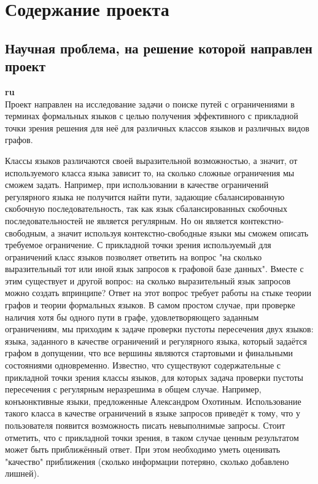 \documentclass[12pt]{article}  %
\theoremstyle{remark}
\begin{document}
\section{Содержание проекта}

\subsection{Научная проблема, на решение которой направлен проект}

\textbf{ru}\\
%
Проект направлен на исследование задачи о поиске путей с ограничениями в терминах формальных языков с целью получения эффективного с прикладной точки зрения решения для неё для различных классов языков и различных видов графов.

Классы языков различаются своей выразительной возможностью, а значит, от используемого класса языка зависит то, на сколько сложные ограничения мы сможем задать.
Например, при использовании в качестве ограничений регулярного языка не получится найти пути, задающие сбалансированную скобочную последовательность, так как язык сбалансированных скобочных последовательностей не является регулярным.
Но он является контекстно-свободным, а значит используя контекстно-свободные языки мы сможем описать требуемое ограничение.
С прикладной точки зрения используемый для ограничений класс языков позволяет ответить на вопрос "на сколько выразительный тот или иной язык запросов к графовой базе данных".
Вместе с этим существует и другой вопрос: на сколько выразительный язык запросов можно создать впринципе?
Ответ на этот вопрос требует работы на стыке теории графов и теории формальных языков.
В самом простом случае, при проверке наличия хотя бы одного пути в графе, удовлетворяющего заданным ограничениям, мы приходим к задаче проверки пустоты пересечения двух языков: языка, заданного в качестве ограничений и регулярного языка, который задаётся графом в допущении, что все вершины являются стартовыми и финальными состояниями одновременно.
Известно, что существуют содержательные с прикладной точки зрения классы языков, для которых задача проверки пустоты пересечения с регулярным неразрешима в общем случае.
Например, конъюнктивные языки, предложенные Александром Охотиным.
Использование такого класса в качестве ограничений в языке запросов приведёт к тому, что у пользователя появится возможность писать невыполнимые запросы.
Стоит отметить, что с прикладной точки зрения, в таком случае ценным результатом может быть приближённый ответ.
При этом необходимо уметь оценивать "качество" приближения (сколько информации потеряно, сколько добавлено лишней).
\end{document}
